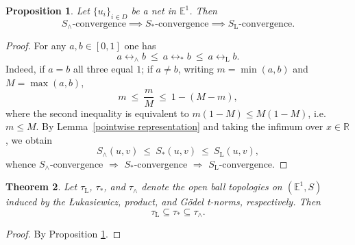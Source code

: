 \documentclass[preprint,3p,times]{elsarticle}
\theoremstyle{plain}
\newtheorem{thm}{Theorem}[section]
\newtheorem{prop}[thm]{Proposition}
\theoremstyle{definition}
\newcommand{\Luk}{\mathrm{L}}
\numberwithin{equation}{section}
\begin{document}
\begin{prop}\label{convergence relation under different t-norm}
    Let  \(\{u_i\}_{i\in D}\) be a net in \(\mathbb{E}^1\).
    Then \[S_{\wedge}\text{-convergence}  \implies S_{*}\text{-convergence} \implies S_{\Luk}\text{-convergence}.\] 
\end{prop}
\begin{proof}
For any $a,b\in[0,1]$ one has
\[
a\leftrightarrow_{\wedge}b\ \le\ a\leftrightarrow_{*}b\ \le\ a\leftrightarrow_{\Luk}b .
\]
Indeed, if $a=b$ all three equal $1$; if $a\ne b$, writing $m=\min(a,b)$ and $M=\max(a,b)$,
\[
m\ \le\ \frac{m}{M}\ \le\ 1-(M-m),
\]
where the second inequality is equivalent to $m(1-M)\le M(1-M)$, i.e.\ $m\le M$. By Lemma~\ref{pointwise representation} and taking the infimum over $x\in\mathbb{R}$, we obtain
\[
S_{\wedge}(u,v)\ \le\ S_{*}(u,v)\ \le\ S_{\Luk}(u,v),
\]
whence $S_{\wedge}$-convergence $\Rightarrow$ $S_{*}$-convergence $\Rightarrow$ $S_{\Luk}$-convergence.
\end{proof}


\begin{thm}
Let \(\tau_{\Luk}\), \(\tau_{*}\), and \(\tau_{\wedge}\) denote the open ball topologies on \((\mathbb{E}^1,S)\) induced by the {\L}ukasiewicz, product, and G\"odel t-norms, respectively. Then
\[
\tau_{\Luk}\subseteq \tau_{*}\subseteq \tau_{\wedge}.
\]
\end{thm}
\begin{proof}
    By Proposition \ref{convergence relation under different t-norm}.
\end{proof}
\end{document}
